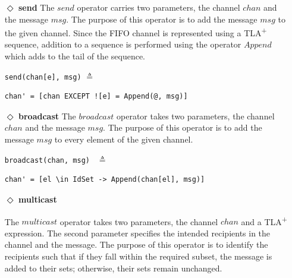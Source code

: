 \documentclass{thesul}
\newcommand{\tlaplus}{TLA\textsuperscript{+}\xspace}
\begin{document}
\begin{itemize}

\item[$\Diamond$]  \textbf{send} The $send$ operator carries two parameters, the channel $chan$ and the message $msg$. The purpose of this operator is to add the message $msg$ to
the given channel. Since the FIFO channel is represented using a \tlaplus sequence, addition to a sequence is performed using the operator $Append$ which adds to the tail of the sequence.

\begin{minipage}{.25\textwidth}

\lstinline|send(chan[e], msg)| $\triangleq$
\end{minipage}\hfill
\begin{minipage}{\textwidth}
\begin{lstlisting}[frame = none, numbers = none]
chan' = [chan EXCEPT ![e] = Append(@, msg)]
\end{lstlisting}

\end{minipage}\hfill

\item[$\Diamond$]  \textbf{broadcast}
The $broadcast$ operator takes two parameters, the channel $chan$ and the message $msg$. The purpose of this operator is to add the message $msg$ to every element of the given channel.

\begin{minipage}{.25\textwidth}

\lstinline|broadcast(chan, msg) | $\triangleq$
\end{minipage}\hfill
\begin{minipage}{.7\textwidth}
\begin{lstlisting}[frame = none, numbers = none]
chan' = [el \in IdSet -> Append(chan[el], msg)]
\end{lstlisting}

\end{minipage}\hfill

\item[$\Diamond$] \textbf{multicast}

The $multicast$ operator takes two parameters, the channel $chan$ and a \tlaplus expression. The second parameter specifies the intended recipients in the channel and the message. The purpose of this operator is to identify the recipients such that if they fall within the required subset, the message is added to their sets; otherwise, their sets remain unchanged.


\end{itemize}
\end{document}
